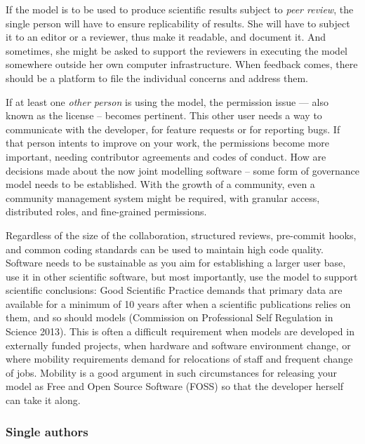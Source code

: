 \documentclass[preprint,11pt,5p]{elsarticle}
\begin{document}
If the model is to be used to produce scientific results subject to
\emph{peer review}, the single person will have to ensure replicability
of results. She will have to subject it to an editor or a reviewer, thus
make it readable, and document it. And sometimes, she might be asked to
support the reviewers in executing the model somewhere outside her own
computer infrastructure. When feedback comes, there should be a platform
to file the individual concerns and address them.

If at least one \emph{other person} is using the model, the permission
issue --- also known as the license -- becomes pertinent. This other
user needs a way to communicate with the developer, for feature requests
or for reporting bugs. If that person intents to improve on your work,
the permissions become more important, needing contributor agreements
and codes of conduct. How are decisions made about the now joint
modelling software -- some form of governance model needs to be
established. With the growth of a community, even a community management
system might be required, with granular access, distributed roles, and
fine-grained permissions.

Regardless of the size of the collaboration, structured reviews,
pre-commit hooks, and common coding standards can be used to maintain
high code quality. Software needs to be sustainable as you aim for
establishing a larger user base, use it in other scientific software,
but most importantly, use the model to support scientific conclusions:
Good Scientific Practice demands that primary data are available for a
minimum of 10 years after when a scientific publications relies on them,
and so should models (Commission on Professional Self Regulation in
Science 2013). This is often a difficult requirement when models are
developed in externally funded projects, when hardware and software
environment change, or where mobility requirements demand for
relocations of staff and frequent change of jobs. Mobility is a good
argument in such circumstances for releasing your model as Free and Open
Source Software (FOSS) so that the developer herself can take it along.

\subsubsection{Single authors}\label{single-authors}
\end{document}
